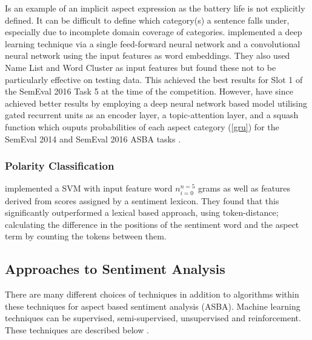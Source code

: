 \documentclass[11pt]{article}
\begin{document}
Is an example of an implicit aspect expression as the battery life is not explicitly defined. 
\newline\newline
 It can be difficult to define which category(s) a sentence falls under, especially due to incomplete domain coverage of categories. 
\newline\newline
\textcolor{cite}{\citet{tohsu}} implemented a deep learning technique via a single feed-forward neural network and a convolutional neural network using the input features as word embeddings. They also used Name List and Word
Cluster as input features but found these not to be particularly effective on testing data. This achieved the best results for Slot 1 of the SemEval 2016 Task 5 at the time of the competition. 
\newline\newline
However, \textcolor{cite}{\citet{acdgru}} have since achieved better results by employing a deep neural network based model utilising gated recurrent units as an encoder layer, a topic-attention layer, and a squash function which ouputs probabilities of each aspect category (\ref{gru}) for the SemEval 2014 and SemEval 2016 ASBA tasks . 

\subsubsection{Polarity Classification}
\textcolor{cite}{\citet{polaritywagner}} implemented a SVM with input feature word $n_{i=0}^{n=5}$ grams as well as features derived from scores assigned by a sentiment lexicon. They found that this significantly outperformed a lexical based approach, using token-distance; calculating the difference in the positions of the sentiment word and the aspect term by counting the tokens between them. 

\subsection{Approaches to Sentiment Analysis}
There are many different choices of techniques in addition to algorithms within these techniques for aspect based sentiment analysis (ASBA). Machine learning techniques can be supervised, semi-supervised, unsupervised and reinforcement. These techniques are described below \textcolor{cite}{\citet{hundred-page-machine-learning}}.
\end{document}
